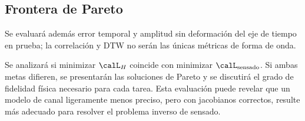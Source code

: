 \subsection{Frontera de Pareto}

Se evaluará además error temporal y amplitud sin deformación del eje de tiempo
en prueba; la correlación y DTW no serán las únicas métricas de forma de onda.

Se analizará si minimizar $\calL_H$ coincide con minimizar $\calL_{\rm sensado}$. Si ambas metas difieren, se presentarán las soluciones de Pareto y se discutirá el grado de fidelidad física necesario para cada tarea. Esta evaluación puede revelar que un modelo de canal ligeramente menos preciso, pero con jacobianos correctos, resulte más adecuado para resolver el problema inverso de sensado.
